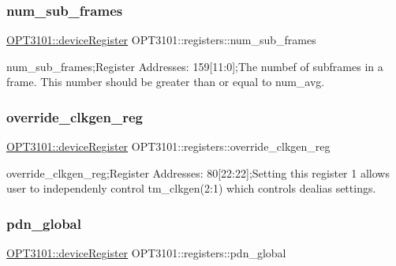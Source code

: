 \subsubsection{\texorpdfstring{num\+\_\+sub\+\_\+frames}{num\_sub\_frames}}
{\footnotesize\ttfamily \mbox{\hyperlink{class_o_p_t3101_1_1device_register}{O\+P\+T3101\+::device\+Register}} O\+P\+T3101\+::registers\+::num\+\_\+sub\+\_\+frames}



num\+\_\+sub\+\_\+frames;Register Addresses\+: 159\mbox{[}11\+:0\mbox{]};The numbef of subframes in a frame. This number should be greater than or equal to num\+\_\+avg. 

\mbox{\label{class_o_p_t3101_1_1registers_a74924d92cebb360f0486813366722331}} 
\subsubsection{\texorpdfstring{override\+\_\+clkgen\+\_\+reg}{override\_clkgen\_reg}}
{\footnotesize\ttfamily \mbox{\hyperlink{class_o_p_t3101_1_1device_register}{O\+P\+T3101\+::device\+Register}} O\+P\+T3101\+::registers\+::override\+\_\+clkgen\+\_\+reg}



override\+\_\+clkgen\+\_\+reg;Register Addresses\+: 80\mbox{[}22\+:22\mbox{]};Setting this register \textquotesingle{}1\textquotesingle{} allows user to independenly control tm\+\_\+clkgen(2\+:1) which controls dealias settings. 

\mbox{\label{class_o_p_t3101_1_1registers_ab8f03a92cac033306d1b5639a9a41061}} 
\subsubsection{\texorpdfstring{pdn\+\_\+global}{pdn\_global}}
{\footnotesize\ttfamily \mbox{\hyperlink{class_o_p_t3101_1_1device_register}{O\+P\+T3101\+::device\+Register}} O\+P\+T3101\+::registers\+::pdn\+\_\+global}



